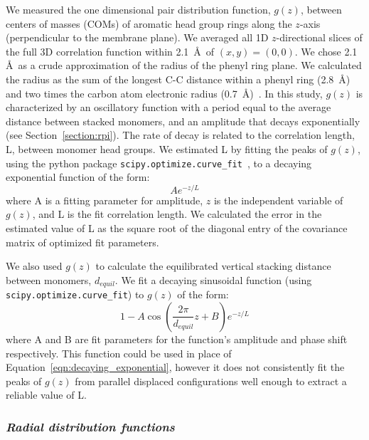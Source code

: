 \documentclass[journal=jpcbfk,manuscript=article]{achemso}
\begin{document}
  We measured the one dimensional pair distribution function, $g(z)$, between centers 
  of masses (COMs) of aromatic head group rings along the $z$-axis (perpendicular to
  the membrane plane). We averaged all 1D $z$-directional slices of the full 3D 
  correlation function within 2.1~\AA~of $(x, y)=(0, 0)$. We chose 2.1 \AA~as a crude 
  approximation of the radius of the phenyl ring plane. 
  We calculated the radius as the sum of the longest C-C distance within a phenyl 
  ring (2.8~\AA) and two times the carbon atom electronic radius (0.7~\AA)~\cite{slater_atomic_1964}.
  In this study, $g(z)$ is characterized by an oscillatory function with a period equal to the
  average distance between stacked monomers, and an amplitude that decays exponentially
  (see Section~\ref{section:rpi}). The rate of decay is related to the correlation 
  length, L, between monomer head groups. We estimated L by fitting the peaks of $g(z)$,
  using the python package \texttt{scipy.optimize.curve\_fit}~\cite{oliphant_python_2007},
  to a decaying exponential function of the form:
  \begin{equation}
  	Ae^{-z/L}
  	\label{eqn:decaying_exponential}
  \end{equation}
  where A is a fitting parameter for amplitude, $z$ is the independent variable of $g(z)$, 
  and L is the fit correlation length. We calculated the error in the estimated value
  of L as the square root of the diagonal entry of the covariance matrix of 
  optimized fit parameters.
  
  We also used $g(z)$ to calculate the equilibrated vertical stacking distance between
  monomers, $d_{equil}$. We fit a decaying sinusoidal function (using \texttt{scipy.optimize.curve\_fit}) to 
  $g(z)$ of the form:
  \begin{equation}
  	1 - A\cos\left(\frac{2\pi}{\mathit{d}_{equil}}z + B\right)e^{-z/L}
  	\label{eqn:decaying_sinusoid}
  \end{equation}
  where A and B are fit parameters for the function's amplitude and phase shift respectively.
  This function could be used in place of Equation~\ref{eqn:decaying_exponential}, however
  it does not consistently fit the peaks of $g(z)$ from parallel displaced configurations 
  well enough to extract a reliable value of L.
  
  \subsubsection{\textit{Radial distribution functions}}\label{method:rdfs}
\end{document}
